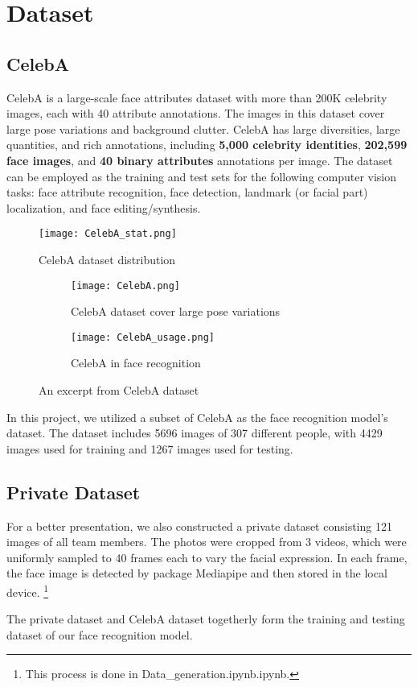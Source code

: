 \section{Dataset}

\subsection{CelebA} \label{sec:CelebA}

CelebA is a large-scale face attributes dataset with more than 200K celebrity images, each with 40 attribute annotations. The images in this dataset cover large pose variations and background clutter. CelebA has large diversities, large quantities, and rich annotations, including \textbf{5,000 celebrity identities}, \textbf{202,599 face images}, and \textbf{40 binary attributes} annotations per image. The dataset can be employed as the training and test sets for the following computer vision tasks: face attribute recognition, face detection, landmark (or facial part) localization, and face editing/synthesis.

\begin{figure}[h]
\centering
\texttt{[image: CelebA\_stat.png]}
\caption{CelebA dataset distribution}
\label{fig:CelebA_stat}
\end{figure}

\begin{figure}[htbp]
    \centering
    \begin{subfigure}{0.4\textwidth}
        \centering
        \texttt{[image: CelebA.png]}
        \caption{CelebA dataset cover large pose variations}
    \end{subfigure}
    \qquad
    \begin{subfigure}{0.4\textwidth}
        \centering
        \texttt{[image: CelebA\_usage.png]}
        \caption{CelebA in face recognition}
    \end{subfigure}
    \caption{An excerpt from CelebA dataset}
    \label{fig:CelebA}
\end{figure}

In this project, we utilized a subset of CelebA as the face recognition model's dataset. The dataset includes 5696 images of 307 different people, with 4429 images used for training and 1267 images used for testing.

\subsection{Private Dataset}

For a better presentation, we also constructed a private dataset consisting 121 images of all team members. The photos were cropped from 3 videos, which were uniformly sampled to 40 frames each to vary the facial expression. In each frame, the face image is detected by package Mediapipe and then stored in the local device. \footnote{This process is done in Data\_generation.ipynb.ipynb.}

The private dataset and CelebA dataset togetherly form the training and testing dataset of our face recognition model.
